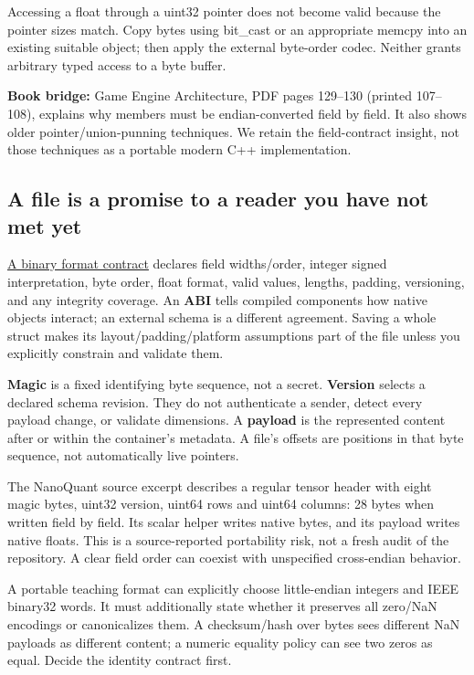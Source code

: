 Accessing a float through a uint32 pointer does not become valid because the pointer sizes match. Copy bytes using bit\_cast or an appropriate memcpy into an existing suitable object; then apply the external byte-order codec. Neither grants arbitrary typed access to a byte buffer.

\textbf{Book bridge:} Game Engine Architecture, PDF pages 129--130 (printed 107--108), explains why members must be endian-converted field by field. It also shows older pointer/union-punning techniques. We retain the field-contract insight, not those techniques as a portable modern C++ implementation.

\subsection{A file is a promise to a reader you have not met yet}\label{01-foundations-i-ch002-a-file-is-a-promise-to-a-reader-you-have-not-met-yet}

\hypertarget{01-foundations-i-ch002-a-file-is-a-promise-to-a-reader-you-have-not-met-yet}{}

\hyperref[appendix-590bbb2424c1]{A binary format contract} declares field widths/order, integer signed interpretation, byte order, float format, valid values, lengths, padding, versioning, and any integrity coverage. An \textbf{ABI} tells compiled components how native objects interact; an external schema is a different agreement. Saving a whole struct makes its layout/padding/platform assumptions part of the file unless you explicitly constrain and validate them.

\textbf{Magic} is a fixed identifying byte sequence, not a secret. \textbf{Version} selects a declared schema revision. They do not authenticate a sender, detect every payload change, or validate dimensions. A \textbf{payload} is the represented content after or within the container's metadata. A file's offsets are positions in that byte sequence, not automatically live pointers.

The NanoQuant source excerpt describes a regular tensor header with eight magic bytes, uint32 version, uint64 rows and uint64 columns: 28 bytes when written field by field. Its scalar helper writes native bytes, and its payload writes native floats. This is a source-reported portability risk, not a fresh audit of the repository. A clear field order can coexist with unspecified cross-endian behavior.

A portable teaching format can explicitly choose little-endian integers and IEEE binary32 words. It must additionally state whether it preserves all zero/NaN encodings or canonicalizes them. A checksum/hash over bytes sees different NaN payloads as different content; a numeric equality policy can see two zeros as equal. Decide the identity contract first.

